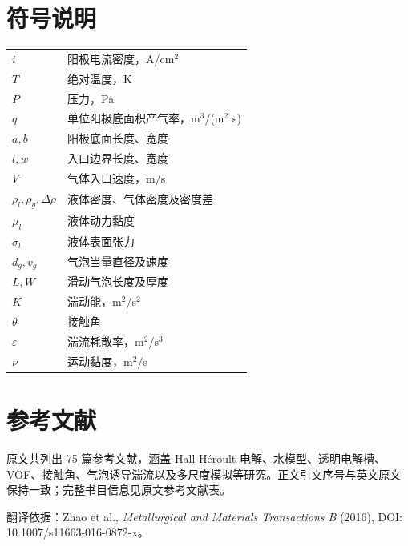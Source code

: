 \documentclass[UTF8,zihao=-4,fontset=fandol]{ctexart}
\begin{document}
\section*{符号说明}
\begin{longtable}{p{}p{}}
$i$&阳极电流密度，A/cm$^2$\\$T$&绝对温度，K\\$P$&压力，Pa\\$q$&单位阳极底面积产气率，m$^3$/(m$^2$ s)\\
$a,b$&阳极底面长度、宽度\\$l,w$&入口边界长度、宽度\\$V$&气体入口速度，m/s\\
$\rho_l,\rho_g,\Delta\rho$&液体密度、气体密度及密度差\\$\mu_l$&液体动力黏度\\$\sigma_l$&液体表面张力\\
$d_g,v_g$&气泡当量直径及速度\\$L,W$&滑动气泡长度及厚度\\$K$&湍动能，m$^2$/s$^2$\\
$\theta$&接触角\\$\varepsilon$&湍流耗散率，m$^2$/s$^3$\\$\nu$&运动黏度，m$^2$/s\\
\end{longtable}

\section*{参考文献}
\small 原文共列出 75 篇参考文献，涵盖 Hall-H\'eroult 电解、水模型、透明电解槽、VOF、接触角、气泡诱导湍流以及多尺度模拟等研究。正文引文序号与英文原文保持一致；完整书目信息见原文参考文献表。

\vfill\begin{center}\footnotesize 翻译依据：Zhao et al., \emph{Metallurgical and Materials Transactions B} (2016), DOI: 10.1007/s11663-016-0872-x。\end{center}
\end{document}
